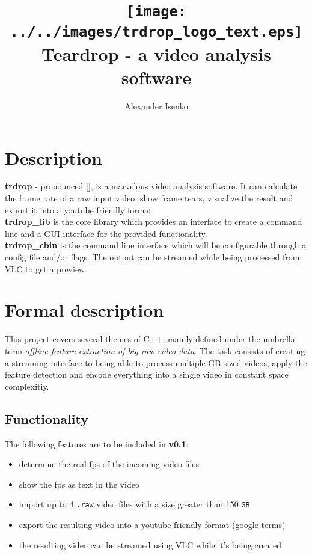\documentclass[titlepage]{article}
\title{\texttt{[image: ../../images/trdrop\_logo\_text.eps]} \\[50pt]
Teardrop - a video analysis software}
\author{Alexander Isenko}
\date{}
\begin{document}
\maketitle

\newpage

\section{Description}

\textbf{trdrop} - pronounced [\textit{}], is a marvelous video analysis software. It can calculate the frame rate of a raw input video, show frame tears, visualize the result and export it into a youtube friendly format. \\[2mm]
\hfill
\textbf{trdrop\_lib} is the core library which provides an interface to create a command line and a GUI interface for the provided functionality. \\[2mm]
\hfill
\textbf{trdrop\_cbin} is the command line interface which will be configurable through a config file and/or flags. The output can be streamed while being processed from VLC to get a preview.

\section{Formal description}

This project covers several themes of C++, mainly defined under the umbrella term \textit{offline feature extraction of big raw video data}. The task consists of creating a streaming interface to being able to process multiple GB sized videos, apply the feature detection and encode everything into a single video in constant space complexitiy.

\subsection{Functionality}

The following features are to be included in \textbf{v0.1}:

\begin{itemize}
    \item determine the real fps of the incoming video files
    \item show the fps as text in the video
    \item import up to 4 \texttt{.raw} video files with a size greater than 150 \texttt{GB}
    \item export the resulting video into a youtube friendly format (\href{https://support.google.com/youtube/answer/1722171}{google-terms})
    \item the resulting video can be streamed using VLC while it's being created
\end{itemize}
\end{document}
